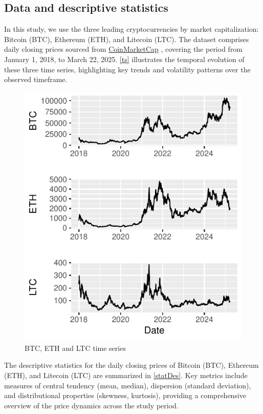 \documentclass{dsfe}
\begin{document}
\subsection{Data and descriptive statistics}
In this study, we use the three leading cryptocurrencies by market capitalization: Bitcoin (BTC), Ethereum (ETH), and Litecoin (LTC). The dataset comprises daily closing prices sourced from \href{https://coinmarketcap.com}{CoinMarketCap} , covering the period from January 1, 2018, to March 22, 2025.  \autoref{ts} illustrates the temporal evolution of these three time series, highlighting key trends and volatility patterns over the observed timeframe.
\begin{figure}[H]
\centering \includegraphics[scale=1.5]{ts.pdf}
\caption{BTC, ETH and LTC time series}\label{ts}
\end{figure}
The descriptive statistics for the daily closing prices of Bitcoin (BTC), Ethereum (ETH), and Litecoin (LTC) are summarized in \autoref{statDes}. Key metrics include measures of central tendency (mean, median), dispersion (standard deviation), and distributional properties (skewness, kurtosis), providing a comprehensive overview of the price dynamics across the study period.
\end{document}
